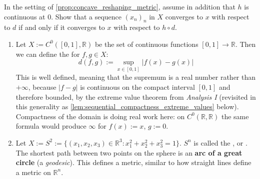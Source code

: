 \begin{exercise}
\label{ex:reshaping_same_convergence}
In the setting of \cref{prop:concave_reshaping_metric}, assume in addition that $h$ is continuous
at $0$. Show that a sequence $(x_n)_n$ in $X$ converges to $x$ with respect to $d$ if and only if
it converges to $x$ with respect to $h \circ d$.
\end{exercise}

\begin{example}[continued]
\begin{enumerate}[label=\textbf{(\alph*)}, start=3]
  \item Let $X := C^0([0,1], \mathbb{R})$ be the set of continuous functions $[0,1] \to \mathbb{R}$.
    Then we can define the  for $f, g \in X$:
    \[
    d(f,g) := \sup_{x \in [0,1]} |f(x) - g(x)|
    \]
    This is well defined, meaning that the supremum is a real number rather than $+\infty$, because
    $|f-g|$ is continuous on the compact interval $[0,1]$ and therefore bounded, by the extreme
    value theorem from \emph{Analysis I} (revisited in this generality as
    \cref{lem:sequential_compactness_extreme_values} below). Compactness of the domain is doing
    real work here: on $C^0(\mathbb{R},\mathbb{R})$ the same formula would produce $\infty$ for
    $f(x) := x$, $g := 0$.
  \item Let $X := S^2 := \{(x_1,x_2,x_3) \in \mathbb{R}^3 : x_1^2 + x_2^2 + x_3^2 = 1\}$. $S^n$ is
    called the , or . The shortest path between
    two points on the sphere is an \textbf{arc of a great circle} (a \textit{geodesic}). This
    defines a metric, similar to how straight lines define a metric on $\mathbb{R}^n$.
\end{enumerate}
\end{example}


